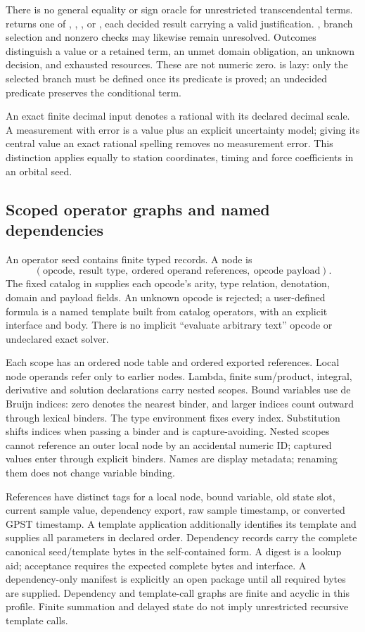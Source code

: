 There is no general equality or sign oracle for unrestricted transcendental
terms.  returns one of , , , or
, each decided result carrying a valid justification.
, branch selection and nonzero checks may likewise remain unresolved.
Outcomes distinguish a value or a retained term, an unmet domain obligation,
an unknown decision, and exhausted resources. These are not numeric zero.
 is lazy: only the selected branch must be defined once its predicate
is proved; an undecided predicate preserves the conditional term.

An exact finite decimal input denotes a rational with its declared decimal
scale. A measurement with error is a value plus an explicit uncertainty model;
giving its central value an exact rational spelling removes no measurement
error. This distinction applies equally to station coordinates, timing and force
coefficients in an orbital seed.

\subsection{Scoped operator graphs and named dependencies}
An operator seed contains finite typed records. A node is
\[
 (\text{opcode},\ \text{result type},\ \text{ordered operand references},
 \ \text{opcode payload}).
\]
The fixed  catalog in  supplies
each opcode's arity, type relation, denotation, domain and payload fields.
An unknown opcode is rejected; a user-defined formula is a named template built
from catalog operators, with an explicit interface and body. There is no implicit
``evaluate arbitrary text'' opcode or undeclared exact solver.

Each scope has an ordered node table and ordered exported references. Local
node operands refer only to earlier nodes. Lambda, finite sum/product, integral,
derivative and solution declarations carry nested scopes. Bound variables use
de Bruijn indices: zero denotes the nearest binder, and larger indices count
outward through lexical binders. The type environment fixes every index.
Substitution shifts indices when passing a binder and is capture-avoiding.
Nested scopes cannot reference an outer local node by an accidental numeric ID;
captured values enter through explicit binders. Names are display metadata;
renaming them does not change variable binding.

References have distinct tags for a local node, bound variable, old state slot,
current sample value, dependency export, raw sample timestamp, or converted GPST
timestamp. A template application additionally
identifies its template and supplies all parameters in declared order. Dependency
records carry the complete canonical seed/template bytes in the self-contained
form. A digest is a lookup aid; acceptance requires the expected complete bytes
and interface. A dependency-only manifest is explicitly an open package until
all required bytes are supplied. Dependency and template-call graphs are finite
and acyclic in this profile. Finite summation and delayed state do not imply
unrestricted recursive template calls.

